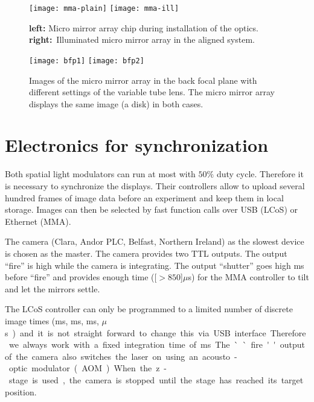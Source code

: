 \begin{figure}[!hbt]
  \centering
  \texttt{[image: mma-plain]}
  \texttt{[image: mma-ill]}
  \caption{{\bf left:} Micro mirror array chip during installation of
    the optics. {\bf right:}~Illuminated micro mirror array in the
    aligned system.}
  \label{fig:mma-closeup}
\end{figure}

\begin{figure}[!hbt]
  \centering
  \texttt{[image: bfp1]}
  \texttt{[image: bfp2]}
  \caption{Images of the micro mirror array in the back focal plane
    with different settings of the variable tube lens. The micro mirror
    array displays the same image (a disk) in both cases.}
  \label{fig:tubelens-bfp}
\end{figure}

\newpage
\section{Electronics for synchronization}
Both spatial light modulators can run at most with $50\%$ duty
cycle. Therefore it is necessary to synchronize the displays. Their
controllers allow to upload several hundred frames of image data
before an experiment and keep them in local storage. Images can then
be selected by fast function calls over USB (LCoS) or Ethernet (MMA).

The camera (Clara, Andor PLC, Belfast, Northern Ireland) as the
slowest device is chosen as the master. The camera provides two TTL
outputs. The output ``fire'' is high while the camera is
integrating. The output ``shutter'' goes high \unit[1]{ms} before
``fire'' and provides enough time (\unit[$>850$]{$\mu$s}) for the MMA
controller to tilt and let the mirrors settle.

The LCoS controller can only be programmed to a limited number of
discrete image times (\unit[20]{ms}, \unit[10]{ms}, \unit[5]{ms},
\unit[200]{$\mu$s}) and it is not straight forward to change this via
USB interface. Therefore we always work with a fixed integration time
of \unit[20]{ms}. The ``fire'' output of the camera also switches the
laser on using an acousto-optic modulator (AOM).

When the z-stage is used, the camera is stopped until the stage has
reached its target position.

